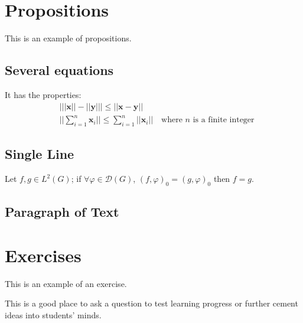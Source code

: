 
\section{Propositions}

This is an example of propositions.

\subsection{Several equations}

\begin{proposition}
It has the properties:
\begin{align}
& \big| ||\mathbf{x}|| - ||\mathbf{y}|| \big|\leq || \mathbf{x}- \mathbf{y}||\\
&  ||\sum_{i=1}^n\mathbf{x}_i||\leq \sum_{i=1}^n||\mathbf{x}_i||\quad\text{where $n$ is a finite integer}
\end{align}
\end{proposition}

\subsection{Single Line}

\begin{proposition} 
Let $f,g\in L^2(G)$; if $\forall \varphi\in\mathcal{D}(G)$, $(f,\varphi)_0=(g,\varphi)_0$ then $f = g$. 
\end{proposition}

\subsection{Paragraph of Text}

\begin{example}
\lipsum[2]
\end{example}


\section{Exercises}

This is an example of an exercise.

\begin{exercise}
This is a good place to ask a question to test learning progress or further cement ideas into students' minds.
\end{exercise}

